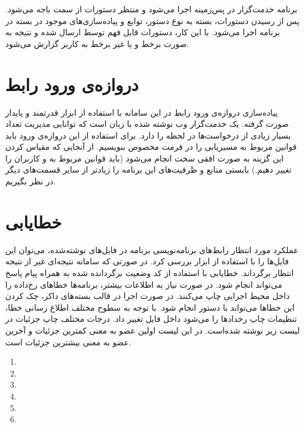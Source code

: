 برنامه خدمت‌گزار در پس‌زمینه اجرا می‌شود و منتظر دستورات از سمت باجه می‌شود. پس از رسیدن دستورات، بسته به نوع دستور، توابع و پیاده‌سازی‌های موجود در بسته  در برنامه اجرا می‌شود. با این کار، دستورات قابل فهم توسط  ارسال شده و نتیجه به صورت برخط و یا غیر برخط به کاربر گزارش می‌شود.


\section{‌دروازه‌ی ورود رابط}
پیاده‌سازی ‌دروازه‌ی ورود رابط در این سامانه با استفاده از ابزار قدرتمند و پایدار  صورت گرفته.  یک خدمت‌گزار وب نوشته شده با زبان  است که توانایی مدیریت تعداد بسیار زیادی از درخواست‌ها در لحظه را دارد. برای استفاده از این ‌دروازه‌ی ورود باید قوانین مربوط به مسیریابی را در فرمت مخصوص بنویسیم. از آنجایی که مقیاس کردن این گزینه به صورت افقی سخت انجام می‌شود (باید قوانین مربوط به  و کاربران را تغییر دهیم.) بایستی منابع و ظرفیت‌های این برنامه‌ را زیاد‌تر از سایر قسمت‌های دیگر در نظر بگیریم.

\section{خطایابی}
عملکرد مورد انتظار رابط‌های برنامه‌نویسی برنامه در فایل‌های  نوشته‌شده، می‌توان این فایل‌ها را با استفاده از ابزار  بررسی کرد. در صورتی که سامانه نتیجه‌ای غیر از نتیجه انتظار برگرداند. خطایابی با استفاده از کد وضعیت برگردانده شده به همراه پیام پاسخ می‌تواند انجام شود. در صورت نیاز به اطلاعات بیشتر، برنامه‌ها خطا‌های رخ‌داده را داخل  محیط اجرایی چاپ می‌کنند. در صورت اجرا در قالب بسته‌های داکر، چک کردن این خطا‌ها می‌تواند با دستور  انجام شود. با توجه به سطوح مختلف اطلاع رسانی خطا، تنظیمات چاپ رخداد‌ها را می‌شود داخل فایل  تغییر داد. درجات مختلف چاپ جزئیات در لیست زیر نوشته شده‌است. در این لیست اولین عضو به معنی کمترین جزئیات و آخرین عضو به معنی بیشترین جزئیات است.

\begin{enumerate}
	\item {}
	\item {}
	\item {}
	\item {}
	\item {}
	\item {}
\end{enumerate}


